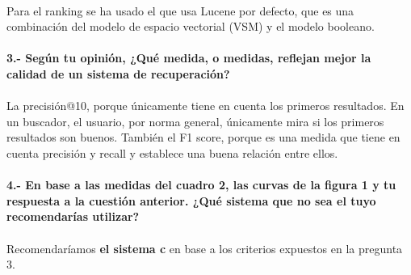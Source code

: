 \documentclass[a4paper]{article}
\begin{document}
\paragraph{}Para el ranking se ha usado el que usa Lucene por defecto, que es una combinación del modelo de espacio vectorial (VSM) y el modelo booleano.
\newpage
\paragraph{3.- Según tu opinión, ¿Qué medida, o medidas, reflejan mejor la calidad de un sistema de recuperación?}
\paragraph{}La precisión@10, porque únicamente tiene en cuenta los primeros resultados. En un buscador, el usuario, por norma general, únicamente mira si los primeros resultados son buenos.
También el F1 score, porque es una medida que tiene en cuenta precisión y recall y establece una buena relación entre ellos.
\paragraph{4.- En base a las medidas del cuadro 2, las curvas de la figura 1 y tu respuesta a la cuestión anterior. ¿Qué sistema que no sea el tuyo recomendarías utilizar?}
\paragraph{}Recomendaríamos \textbf{el sistema c} en base a los criterios expuestos en la pregunta 3.
\end{document}

